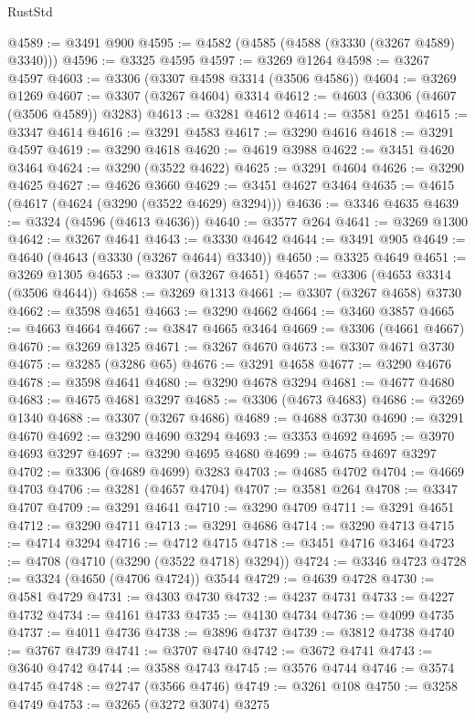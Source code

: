 \begin{lexlean}{RustStd}
\begin{coremodule}
@4589 := @3491 @900
@4595 := @4582 (@4585 (@4588 (@3330 (@3267 @4589) @3340)))
@4596 := @3325 @4595
@4597 := @3269 @1264
@4598 := @3267 @4597
@4603 := @3306 (@3307 @4598 @3314 (@3506 @4586))
@4604 := @3269 @1269
@4607 := @3307 (@3267 @4604) @3314
@4612 := @4603 (@3306 (@4607 (@3506 @4589)) @3283)
@4613 := @3281 @4612
@4614 := @3581 @251
@4615 := @3347 @4614
@4616 := @3291 @4583
@4617 := @3290 @4616
@4618 := @3291 @4597
@4619 := @3290 @4618
@4620 := @4619 @3988
@4622 := @3451 @4620 @3464
@4624 := @3290 (@3522 @4622)
@4625 := @3291 @4604
@4626 := @3290 @4625
@4627 := @4626 @3660
@4629 := @3451 @4627 @3464
@4635 := @4615 (@4617 (@4624 (@3290 (@3522 @4629) @3294)))
@4636 := @3346 @4635
@4639 := @3324 (@4596 (@4613 @4636))
@4640 := @3577 @264
@4641 := @3269 @1300
@4642 := @3267 @4641
@4643 := @3330 @4642
@4644 := @3491 @905
@4649 := @4640 (@4643 (@3330 (@3267 @4644) @3340))
@4650 := @3325 @4649
@4651 := @3269 @1305
@4653 := @3307 (@3267 @4651)
@4657 := @3306 (@4653 @3314 (@3506 @4644))
@4658 := @3269 @1313
@4661 := @3307 (@3267 @4658) @3730
@4662 := @3598 @4651
@4663 := @3290 @4662
@4664 := @3460 @3857
@4665 := @4663 @4664
@4667 := @3847 @4665 @3464
@4669 := @3306 (@4661 @4667)
@4670 := @3269 @1325
@4671 := @3267 @4670
@4673 := @3307 @4671 @3730
@4675 := @3285 (@3286 @65)
@4676 := @3291 @4658
@4677 := @3290 @4676
@4678 := @3598 @4641
@4680 := @3290 @4678 @3294
@4681 := @4677 @4680
@4683 := @4675 @4681 @3297
@4685 := @3306 (@4673 @4683)
@4686 := @3269 @1340
@4688 := @3307 (@3267 @4686)
@4689 := @4688 @3730
@4690 := @3291 @4670
@4692 := @3290 @4690 @3294
@4693 := @3353 @4692
@4695 := @3970 @4693 @3297
@4697 := @3290 @4695 @4680
@4699 := @4675 @4697 @3297
@4702 := @3306 (@4689 @4699) @3283
@4703 := @4685 @4702
@4704 := @4669 @4703
@4706 := @3281 (@4657 @4704)
@4707 := @3581 @264
@4708 := @3347 @4707
@4709 := @3291 @4641
@4710 := @3290 @4709
@4711 := @3291 @4651
@4712 := @3290 @4711
@4713 := @3291 @4686
@4714 := @3290 @4713
@4715 := @4714 @3294
@4716 := @4712 @4715
@4718 := @3451 @4716 @3464
@4723 := @4708 (@4710 (@3290 (@3522 @4718) @3294))
@4724 := @3346 @4723
@4728 := @3324 (@4650 (@4706 @4724)) @3544
@4729 := @4639 @4728
@4730 := @4581 @4729
@4731 := @4303 @4730
@4732 := @4237 @4731
@4733 := @4227 @4732
@4734 := @4161 @4733
@4735 := @4130 @4734
@4736 := @4099 @4735
@4737 := @4011 @4736
@4738 := @3896 @4737
@4739 := @3812 @4738
@4740 := @3767 @4739
@4741 := @3707 @4740
@4742 := @3672 @4741
@4743 := @3640 @4742
@4744 := @3588 @4743
@4745 := @3576 @4744
@4746 := @3574 @4745
@4748 := @2747 (@3566 @4746)
@4749 := @3261 @108
@4750 := @3258 @4749
@4753 := @3265 (@3272 @3074) @3275

\end{coremodule}
\end{lexlean}
